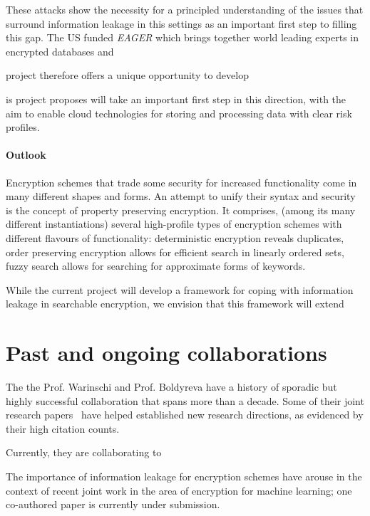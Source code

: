 These attacks show the necessity for a principled understanding of the issues that surround information leakage in this settings as an important first step to filling this gap. 
The US funded \emph{EAGER} which brings together world leading experts in encrypted databases and 

project therefore offers a unique opportunity to develop 

is project proposes will take an important first step in this direction, with the aim to enable cloud technologies for storing and processing data with clear risk profiles. 



\paragraph{Outlook}
Encryption schemes that trade some security for increased functionality come in many different shapes and forms. 
An attempt to unify their syntax and security is the concept of property preserving encryption. 
It comprises, (among its many different instantiations) several high-profile types of encryption schemes with different flavours of functionality: deterministic encryption reveals duplicates, order preserving encryption allows for efficient search in linearly ordered sets, fuzzy search allows for searching for approximate forms of keywords.   

While the current project will develop a framework for coping with information leakage in searchable encryption, we envision that this framework will extend 




\section{Past and ongoing collaborations}
\label{sec:prop_method}
The the Prof. Warinschi and Prof. Boldyreva have a history of sporadic but highly successful collaboration that spans more than a decade. 
Some of their joint research papers~\cite{boldyreva2007closer,boldyreva2009foundations,boldyreva2012secure,lipton2016provably} have helped established new research directions, as evidenced by their high citation counts. 

Currently, they are collaborating to 

The importance of information leakage for encryption schemes have arouse in the context of recent joint work in the area of encryption for machine learning; one co-authored paper is currently under submission. 











